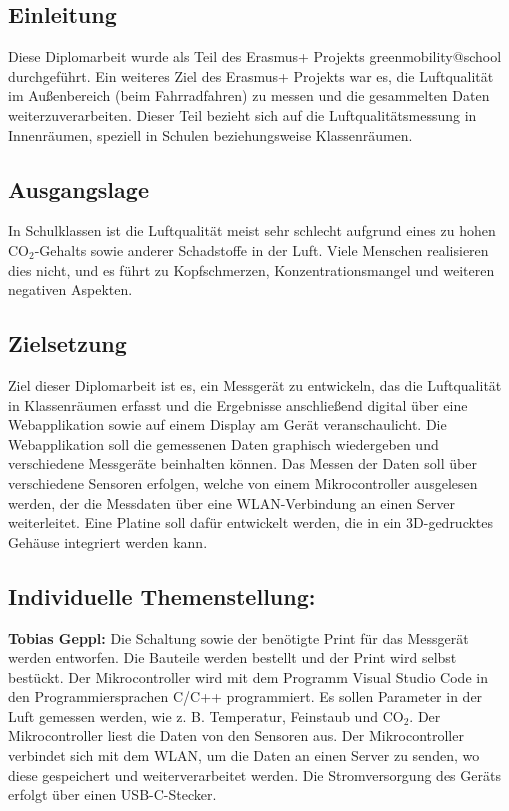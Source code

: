\begin{inhalt}
\renewcommand*\chapterpagestyle{scrheadings}
\chapter{Einleitung}

Diese Diplomarbeit wurde als Teil des Erasmus+ Projekts greenmobility@school durchgeführt. Ein weiteres Ziel des Erasmus+ Projekts war es, die Luftqualität im Außenbereich (beim Fahrradfahren) zu messen und die gesammelten Daten weiterzuverarbeiten. Dieser Teil bezieht sich auf die Luftqualitätsmessung in Innenräumen, speziell in Schulen beziehungsweise Klassenräumen. \cite{Erasmus-Website}


\section{Ausgangslage}

In Schulklassen ist die Luftqualität meist sehr schlecht aufgrund eines zu hohen CO$_2$-Gehalts sowie anderer Schadstoffe in der Luft. Viele Menschen realisieren dies nicht, und es führt zu Kopfschmerzen, Konzentrationsmangel und weiteren negativen Aspekten. \cite{Luftqualitaet-Risiken}

\section{Zielsetzung}

Ziel dieser Diplomarbeit ist es, ein Messgerät zu entwickeln, das die Luftqualität in Klassenräumen erfasst und die Ergebnisse anschließend digital über eine Webapplikation sowie auf einem Display am Gerät veranschaulicht. Die Webapplikation soll die gemessenen Daten graphisch wiedergeben und verschiedene Messgeräte beinhalten können. Das Messen der Daten soll über verschiedene Sensoren erfolgen, welche von einem Mikrocontroller ausgelesen werden, der die Messdaten über eine WLAN-Verbindung an einen Server weiterleitet. Eine Platine soll dafür entwickelt werden, die in ein 3D-gedrucktes Gehäuse integriert werden kann.

\section{Individuelle Themenstellung:}

\textbf{Tobias Geppl:}
Die Schaltung sowie der benötigte Print für das Messgerät werden entworfen. Die Bauteile werden bestellt und der Print wird selbst bestückt. Der Mikrocontroller wird mit dem Programm Visual Studio Code in den Programmiersprachen C/C++ programmiert. Es sollen Parameter in der Luft gemessen werden, wie z. B. Temperatur, Feinstaub und CO$_2$. Der Mikrocontroller liest die Daten von den Sensoren aus. Der Mikrocontroller verbindet sich mit dem WLAN, um die Daten an einen Server zu senden, wo diese gespeichert und weiterverarbeitet werden. Die Stromversorgung des Geräts erfolgt über einen USB-C-Stecker.


\end{inhalt}
